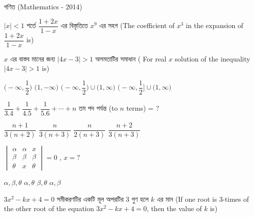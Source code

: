 \documentclass[addpoints]{exam}
\begin{document}
\begin{LARGE}
\begin{center}
গণিত (Mathematics - 2014)
\end{center}
\end{LARGE}
\begin{questions}

\question  $ |x|<1 $ শর্তে $ \dfrac{1+2x}{1-x} $ এর বিস্তৃতিতে $ x^9 $ এর সহগ (The coefficient of $x^3$ in the expansion of $ \dfrac{1+2x}{1-x} $ is) 

\begin{oneparchoices}
\end{oneparchoices}

 \question  $ x $ এর বাস্তব মানের জন্য $ |4x-3|>1 $ অসমতাটির সমাধান  ( For real $ x $ solution of the inequality $ |4x-3|>1 $ is)

\begin{oneparchoices}
\choice $ \Big(-\infty, \dfrac{1}{2}\Big) $
\choice $ \Big(1,-\infty) $
\choice $ \Big(-\infty, \dfrac{1}{2}\Big) \cup \Big(1,\infty\Big)  $
\choice $ \Big(-\infty, \dfrac{1}{2}\Big] \cup \Big(1,\infty\Big)  $

\end{oneparchoices}

\question  $ \dfrac{1}{3.4} + \dfrac{1}{4.5} + \dfrac{1}{5.6} + \cdots +n$ তম পদ পর্যন্ত (to $ n $ terms) = ?

\begin{oneparchoices}
\choice $ \dfrac{n+1}{3(n+2)}$
\choice $ \dfrac{n}{3(n+3)} $
\choice $ \dfrac{n}{2(n+3)} $
\choice  $ \dfrac{n+2}{3(n+3)} $

\end{oneparchoices}

\question  $ \begin{vmatrix}
\alpha & \alpha & x \\
\beta & \beta & \beta \\
\theta & x & \theta
\end{vmatrix} = 0$ , $ x=? $

\begin{oneparchoices}
\choice $ \alpha, \beta, \theta $
\choice $ \alpha, \theta $
\choice $ \beta, \theta $
\choice $ \alpha, \beta $

\end{oneparchoices}

\question  $ 3x^{2}-kx+4=0 $ সমীকরণটির একটি মূল অপরটির 3 গুণ হলে $ k $ এর মান   (If one root is 3-times of the other root of the equation $ 3x^{2}-kx+4=0 $, then the value of $ k $ is)


\end{questions}
\end{document}

